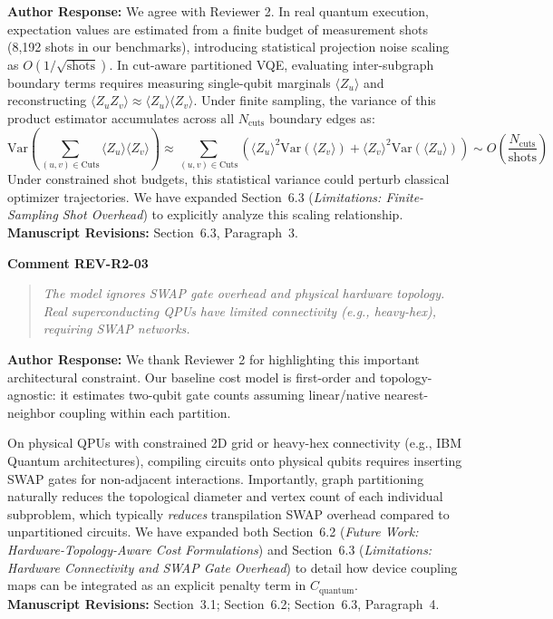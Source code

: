 \documentclass[11pt,a4paper]{article}
\newcommand{\commentbox}[2]{
    \vspace{0.8em}
    \noindent\textbf{\textcolor{commentcolor}{#1}}
    \vspace{0.2em}
    \begin{quote}
        \small\itshape #2
    \end{quote}
}
\newcommand{\responsebox}[1]{
    \noindent\textbf{\textcolor{responsecolor}{Author Response:}} #1
    \vspace{0.8em}
}
\begin{document}
\responsebox{We agree with Reviewer 2. In real quantum execution, expectation values are estimated from a finite budget of measurement shots (8,192 shots in our benchmarks), introducing statistical projection noise scaling as $O(1/\sqrt{\text{shots}})$. In cut-aware partitioned VQE, evaluating inter-subgraph boundary terms requires measuring single-qubit marginals $\langle Z_u \rangle$ and reconstructing $\langle Z_u Z_v \rangle \approx \langle Z_u \rangle \langle Z_v \rangle$. Under finite sampling, the variance of this product estimator accumulates across all $N_{\text{cuts}}$ boundary edges as:
$$\mathrm{Var}\left(\sum_{(u,v)\in\text{Cuts}} \langle Z_u \rangle \langle Z_v \rangle\right) \approx \sum_{(u,v)\in\text{Cuts}} \left( \langle Z_u \rangle^2 \mathrm{Var}(\langle Z_v \rangle) + \langle Z_v \rangle^2 \mathrm{Var}(\langle Z_u \rangle) \right) \sim O\left(\frac{N_{\text{cuts}}}{\text{shots}}\right)$$
Under constrained shot budgets, this statistical variance could perturb classical optimizer trajectories. We have expanded Section~6.3 (\textit{Limitations: Finite-Sampling Shot Overhead}) to explicitly analyze this scaling relationship.
\\[0.3em]
\textbf{Manuscript Revisions:} Section~6.3, Paragraph~3.}

\commentbox{Comment REV-R2-03}{The model ignores SWAP gate overhead and physical hardware topology. Real superconducting QPUs have limited connectivity (e.g., heavy-hex), requiring SWAP networks.}

\responsebox{We thank Reviewer 2 for highlighting this important architectural constraint. Our baseline cost model is first-order and topology-agnostic: it estimates two-qubit gate counts assuming linear/native nearest-neighbor coupling within each partition.

On physical QPUs with constrained 2D grid or heavy-hex connectivity (e.g., IBM Quantum architectures), compiling circuits onto physical qubits requires inserting SWAP gates for non-adjacent interactions. Importantly, graph partitioning naturally reduces the topological diameter and vertex count of each individual subproblem, which typically \textit{reduces} transpilation SWAP overhead compared to unpartitioned circuits. We have expanded both Section~6.2 (\textit{Future Work: Hardware-Topology-Aware Cost Formulations}) and Section~6.3 (\textit{Limitations: Hardware Connectivity and SWAP Gate Overhead}) to detail how device coupling maps can be integrated as an explicit penalty term in $C_{\text{quantum}}$.
\\[0.3em]
\textbf{Manuscript Revisions:} Section~3.1; Section~6.2; Section~6.3, Paragraph~4.}
\end{document}
